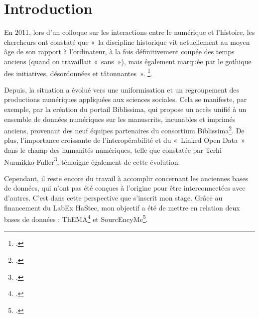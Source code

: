 \documentclass[a4paper,12pt,twoside]{book} %
\begin{document}
\newpage{\pagestyle{empty}\cleardoublepage}


	
\printbibliography[keyword={bibl},title={Bibliographie}]
\printbibliography[keyword={Web},title={Webographie}]
	
\chapter{Introduction}	
En 2011, lors d'un colloque sur les interactions entre le numérique et l'histoire, les chercheurs ont constaté que «~la discipline historique vit actuellement au moyen âge de son rapport à l'ordinateur, à la fois définitivement coupée des temps anciens (quand on travaillait «~sans~»), mais également marquée par le gothique des initiatives, désordonnées et tâtonnantes~». \footcite{thierryJeanPhilippeGenetAndrea2014a}. 

Depuis, la situation a évolué vers une uniformisation et un regroupement des productions numériques appliquées aux sciences sociales. Cela se manifeste, par exemple, par la création du portail Biblissima, qui propose un accès unifié à un ensemble de données numériques sur les manuscrits, incunables et imprimés anciens, provenant des neuf équipes partenaires du consortium Biblissima\footcite{PortailBiblissima}. De plus, l'importance croissante de l'interopérabilité et du  «~Linked Open Data~» dans le champ des humanités numériques, telle que constatée par Terhi Nurmikko-Fuller\footcite{nurmikko-fullerLinkedDataDigital2023}, témoigne également de cette évolution.

Cependant, il reste encore du travail à accomplir concernant les anciennes bases de données, qui n'ont pas été conçues à l'origine pour être interconnectées avec d'autres. C'est dans cette perspective que s'inscrit mon stage. Grâce au financement du LabEx HaStec, mon objectif a été de mettre en relation deux bases de données : ThEMA\footcite{ThEMA} et SourcEncyMe\footcite{SourcEncyMe}.
\end{document}
